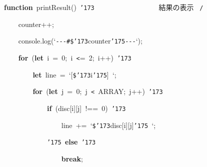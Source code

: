 \documentclass[a4paper,10pt]{article}
\def\mc{\relax}
\begin{document}
\noindent
\mbox{}\textbf{function}{\tt\mc \ }printResult(){\tt\mc \ }{\tt\char'173}{\tt\mc \ }{\tt\mc \ }{\tt\mc \ }{\tt\mc \ }{\tt\mc \ }{\tt\mc \ }{\tt\mc \ }{\tt\mc \ }{\tt\mc \ }{\tt\mc \ }{\tt\mc \ }{\tt\mc \ }{\tt\mc \ }{\tt\mc \ }{\tt\mc \ }{\tt\mc \ }\rm\mc {\tt /}{\tt *}\  \ 結果の表示 \hfill \rm\mc \ {\tt *}{\tt /}
\tt\mc 

\noindent
\mbox{}{\tt\mc \ }{\tt\mc \ }{\tt\mc \ }{\tt\mc \ }counter++;

\noindent
\mbox{}{\tt\mc \ }{\tt\mc \ }{\tt\mc \ }{\tt\mc \ }console.log(`{\tt -}{\tt -}{\tt -}{\tt\#}{\tt\$}{\tt\char'173}counter{\tt\char'175}{\tt -}{\tt -}{\tt -}`);

\noindent
\mbox{}{\tt\mc \ }{\tt\mc \ }{\tt\mc \ }{\tt\mc \ }\textbf{for}{\tt\mc \ }(\textbf{let}{\tt\mc \ }i{\tt\mc \ }={\tt\mc \ }0;{\tt\mc \ }i{\tt\mc \ }{\tt <}={\tt\mc \ }2;{\tt\mc \ }i++){\tt\mc \ }{\tt\char'173}

\noindent
\mbox{}{\tt\mc \ }{\tt\mc \ }{\tt\mc \ }{\tt\mc \ }{\tt\mc \ }{\tt\mc \ }{\tt\mc \ }{\tt\mc \ }\textbf{let}{\tt\mc \ }line{\tt\mc \ }={\tt\mc \ }`[{\tt\$}{\tt\char'173}i{\tt\char'175}]{\tt\mc \ }`;

\noindent
\mbox{}{\tt\mc \ }{\tt\mc \ }{\tt\mc \ }{\tt\mc \ }{\tt\mc \ }{\tt\mc \ }{\tt\mc \ }{\tt\mc \ }\textbf{for}{\tt\mc \ }(\textbf{let}{\tt\mc \ }j{\tt\mc \ }={\tt\mc \ }0;{\tt\mc \ }j{\tt\mc \ }{\tt <}{\tt\mc \ }ARRAY;{\tt\mc \ }j++){\tt\mc \ }{\tt\char'173}

\noindent
\mbox{}{\tt\mc \ }{\tt\mc \ }{\tt\mc \ }{\tt\mc \ }{\tt\mc \ }{\tt\mc \ }{\tt\mc \ }{\tt\mc \ }{\tt\mc \ }{\tt\mc \ }{\tt\mc \ }{\tt\mc \ }\textbf{if}{\tt\mc \ }(disc[i][j]{\tt\mc \ }!=={\tt\mc \ }0){\tt\mc \ }{\tt\char'173}

\noindent
\mbox{}{\tt\mc \ }{\tt\mc \ }{\tt\mc \ }{\tt\mc \ }{\tt\mc \ }{\tt\mc \ }{\tt\mc \ }{\tt\mc \ }{\tt\mc \ }{\tt\mc \ }{\tt\mc \ }{\tt\mc \ }{\tt\mc \ }{\tt\mc \ }{\tt\mc \ }{\tt\mc \ }line{\tt\mc \ }+={\tt\mc \ }`{\tt\$}{\tt\char'173}disc[i][j]{\tt\char'175}{\tt\mc \ }`;

\noindent
\mbox{}{\tt\mc \ }{\tt\mc \ }{\tt\mc \ }{\tt\mc \ }{\tt\mc \ }{\tt\mc \ }{\tt\mc \ }{\tt\mc \ }{\tt\mc \ }{\tt\mc \ }{\tt\mc \ }{\tt\mc \ }{\tt\char'175}{\tt\mc \ }\textbf{else}{\tt\mc \ }{\tt\char'173}

\noindent
\mbox{}{\tt\mc \ }{\tt\mc \ }{\tt\mc \ }{\tt\mc \ }{\tt\mc \ }{\tt\mc \ }{\tt\mc \ }{\tt\mc \ }{\tt\mc \ }{\tt\mc \ }{\tt\mc \ }{\tt\mc \ }{\tt\mc \ }{\tt\mc \ }{\tt\mc \ }{\tt\mc \ }\textbf{break};
\end{document}
